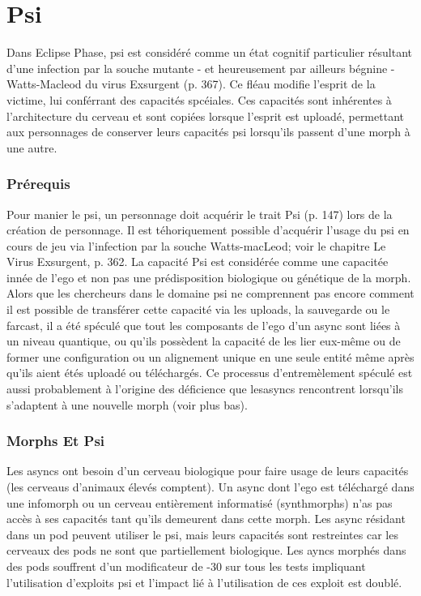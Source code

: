 \section{Psi} Dans Eclipse Phase, psi est considéré comme un état cognitif particulier résultant d'une infection par la souche mutante - et heureusement par ailleurs bégnine - Watts-Macleod du virus Exsurgent (p. 367). Ce fléau modifie l'esprit de la victime, lui conférrant des capacités spcéiales. Ces capacités sont inhérentes à l'architecture du cerveau et sont copiées lorsque l'esprit est uploadé, permettant aux personnages de conserver leurs capacités psi lorsqu'ils passent d'une morph à une autre. 

\subsubsection{Prérequis} 

Pour manier le psi, un personnage doit acquérir le  trait Psi (p. 147) lors de la création de personnage. Il est téhoriquement possible d'acquérir l'usage du psi en cours de jeu via l'infection par la souche Watts-macLeod; voir le chapitre Le Virus Exsurgent, p.  362. La capacité Psi est considérée comme une capacitée innée de l'ego et non pas une prédisposition biologique ou génétique de la morph. Alors que les chercheurs dans le domaine psi ne comprennent pas encore comment il est possible de transférer cette capacité via les uploads, la sauvegarde ou le farcast, il a été spéculé que tout les composants de l'ego d'un async sont liées à un niveau quantique, ou qu'ils possèdent la capacité de les lier eux-même ou de former une configuration ou un alignement unique en une seule entité même après qu'ils aient étés uploadé ou téléchargés. Ce processus d'entremèlement spéculé est aussi probablement à l'origine des déficience que lesasyncs rencontrent lorsqu'ils s'adaptent à une nouvelle morph (voir plus bas). 

\subsubsection{Morphs Et Psi} 

Les asyncs ont besoin d'un cerveau biologique pour faire usage de leurs capacités (les cerveaus d'animaux élevés comptent). Un async dont l'ego est téléchargé dans une infomorph ou un cerveau entièrement informatisé (synthmorphs) n'as pas accès à ses capacités tant qu'ils demeurent dans cette morph. Les async résidant dans un pod peuvent utiliser le psi, mais leurs capacités sont restreintes car les cerveaux des pods ne sont que partiellement biologique. Les ayncs morphés dans des pods souffrent d'un modificateur de -30 sur tous les tests impliquant l'utilisation d'exploits psi et l'impact lié à l'utilisation de ces exploit est doublé. 

